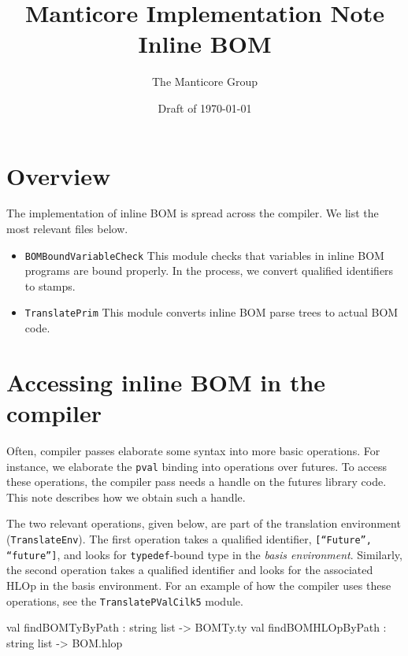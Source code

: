 \documentclass[11pt]{article}
\title{Manticore Implementation Note \\ Inline BOM}
\author{The Manticore Group}
\date{Draft of \today}
\begin{document}
\maketitle

\section{Overview}
The implementation of inline BOM is spread across the compiler. We list the most relevant files below.
\begin{itemize}
\item \texttt{BOMBoundVariableCheck} This module checks that variables in inline BOM programs are 
bound properly. In the process, we convert qualified identifiers to stamps.
\item \texttt{TranslatePrim} This module converts inline BOM parse trees to actual BOM code.
\end{itemize}

\section{Accessing inline BOM in the compiler}
Often, compiler passes elaborate some syntax into more basic operations. For instance, we elaborate the \texttt{pval} binding into operations over futures. To access these operations, the compiler pass needs a handle on the futures library code. This note describes how we obtain such a handle.

The two relevant operations, given below, are part of the translation environment (\texttt{TranslateEnv}). The first operation takes a qualified identifier, \eg{} \texttt{[``Future'', ``future'']}, and looks for \texttt{typedef}-bound type in the \emph{basis environment}. Similarly, the second operation takes a qualified identifier and looks for the associated HLOp in the basis environment. For an example of how the compiler uses these operations, see the \texttt{TranslatePValCilk5} module.

\begin{centercode}
val findBOMTyByPath : string list -> BOMTy.ty
val findBOMHLOpByPath : string list -> BOM.hlop
\end{centercode}
\end{document}
